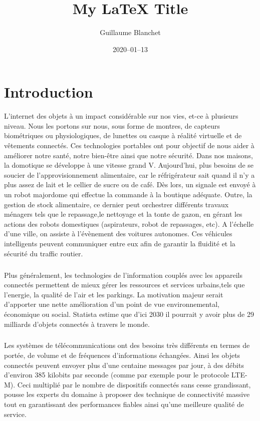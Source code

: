 \documentclass[12pt]{article}
\title{My LaTeX Title}
\author{Guillaume Blanchet}
\date{2020–01–13}
\begin{document}
\maketitle

\section{Introduction}

L'internet des objets à un impact considérable sur nos vies, et-ce à plusieurs niveau.
Nous les portons sur nous, sous forme de montres, de capteurs biométriques ou physiologiques,
de lunettes ou casque à réalité virtuelle et de vêtements connectés. Ces technologies portables 
ont pour objectif de nous aider à améliorer notre santé, notre bien-être ainsi que notre sécurité.
Dans nos maisons, la domotique se développe à une vitesse grand V. Aujourd'hui, plus besoins de se soucier de l'approvisionnement alimentaire, car le réfrigérateur
sait quand il n'y a plus assez de lait et le cellier de sucre ou de café. Dès lors, un signale est envoyé à un robot majordome qui effectue 
la commande à la boutique adéquate. Outre, la gestion de stock alimentaire, ce dernier peut orchestrer différents travaux ménagers tels que le repassage,le nettoyage et la tonte de gazon,
en gérant les actions des robots domestiques (aspirateurs, robot de repassages, etc).
A l'échelle d'une ville, on assiste à l'évènement des voitures autonomes. Ces véhicules intelligents peuvent communiquer entre eux afin de garantir
la fluidité et la sécurité du traffic routier. 
\subparagraph{}Plus généralement, les technologies de l'information couplés 
avec les appareils connectés permettent de mieux gérer les ressources et services urbains,tels que l'energie, la qualité de l'air et les parkings.
La motivation majeur serait d'apporter une nette amélioration d'un point de vue environnemental, économique ou social.
Statista estime que d'ici 2030 il pourrait y avoir plus de 29 milliards d'objets connectés à travers le monde.
\subparagraph{} Les systèmes de télécommunications ont des besoins très différents en termes de portée, de volume et de fréquences d'informations échangées. 
Ainsi les objets connectés peuvent envoyer plus d'une centaine messages par jour, à des débits d'environ 385 kilobits par seconde (comme par exemple pour le protocole LTE-M).
Ceci multiplié par le nombre de dispositifs connectés sans cesse grandissant, pousse les experts du domaine à proposer des technique de connectivité massive tout en garantissant des performances fiables ainsi qu'une meilleure qualité de service.
\end{document}
